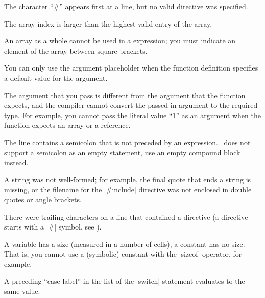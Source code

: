 { 
        The character ``\#'' appears first at a line, but no valid directive
        was specified.

 
        The array index is larger than the highest valid entry of the array.

 
        An array as a whole cannot be used in a expression; you must indicate
        an element of the array between square brackets.

 
        You can only use the argument placeholder when the function definition
        specifies a default value for the argument.

 
        The argument that you pass is different from the argument that the
        function expects, and the compiler cannot convert the passed-in
        argument to the required type. For example, you cannot pass the literal
        value ``1'' as an argument when the function expects an array or a
        reference.

        The line contains a semicolon that is not preceded by an expression.
        \Small\ does not support a semicolon as an empty statement, use an
        empty compound block instead.

 
        A string was not well-formed; for example, the final quote that ends
        a string is missing, or the filename for the |#include| directive was
        not enclosed in double quotes or angle brackets.

 
        There were trailing characters on a line that contained a directive
        (a directive starts with a |#| symbol, see ).

 
        A variable has a size (measured in a number of cells), a constant
        has no size. That is, you cannot use a (symbolic) constant with the
        |sizeof| operator, for example.

 
        A preceding ``case label'' in the list of the |switch| statement
        evaluates to the same value.

}
